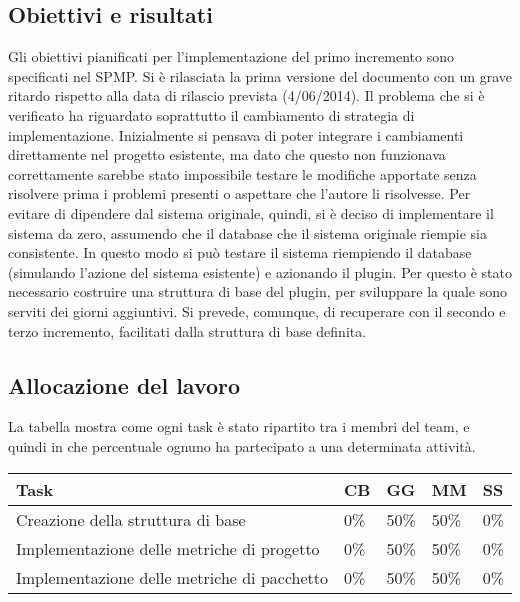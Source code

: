 \subsection{Obiettivi e risultati}
Gli obiettivi pianificati per l'implementazione del primo incremento sono specificati nel SPMP. Si è rilasciata la prima versione del documento con un grave ritardo rispetto alla data di rilascio prevista (4/06/2014). Il problema che si è verificato ha riguardato soprattutto il cambiamento di strategia di implementazione. Inizialmente si pensava di poter integrare i cambiamenti direttamente nel progetto esistente, ma dato che questo non funzionava correttamente sarebbe stato impossibile testare le modifiche apportate senza risolvere prima i problemi presenti o aspettare che l'autore li risolvesse. Per evitare di dipendere dal sistema originale, quindi, si è deciso di implementare il sistema da zero, assumendo che il database che il sistema originale riempie sia consistente. In questo modo si può testare il sistema riempiendo il database (simulando l'azione del sistema esistente) e azionando il plugin. Per questo è stato necessario costruire una struttura di base del plugin, per sviluppare la quale sono serviti dei giorni aggiuntivi. Si prevede, comunque, di recuperare con il secondo e terzo incremento, facilitati dalla struttura di base definita.

\subsection{Allocazione del lavoro}
La tabella mostra come ogni task è stato ripartito tra i membri del team, e quindi in che percentuale ognuno ha partecipato a una determinata attività.
\begin{table}[ht]
 \centering
 \begin{tabular}{|p{7.5cm}|p{1cm}|p{1cm}|p{1cm}|p{1cm}|}
  \hline
  \rowcolor{Gray}\textbf{Task}			& \textbf{CB}		& \textbf{GG}		& \textbf{MM}		& \textbf{SS}		\\
  \hline
  Creazione della struttura di base		& 0\%			& 50\%			& 50\%			& 0\%			\\
  \hline
  Implementazione delle metriche di progetto	& 0\%			& 50\%			& 50\%			& 0\%			\\
  \hline
  Implementazione delle metriche di pacchetto	& 0\%			& 50\%			& 50\%			& 0\%			\\
  \hline
 \end{tabular}
\end{table}



